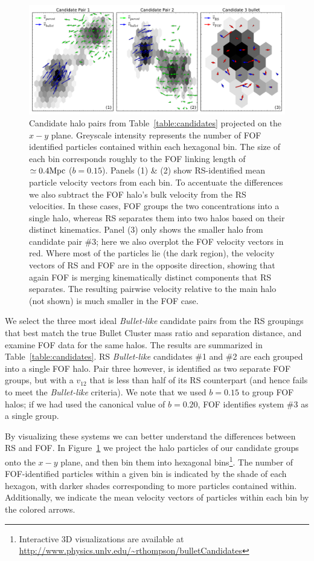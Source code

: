 \documentclass[useAMS, usenatbib]{mn2e}
\newcommand{\vonetwo}{v_{12}}
\begin{document}
\begin{figure}
\includegraphics[scale=0.5]{figure5.pdf}
\caption{Candidate halo pairs from Table~\ref{table:candidates} projected on the $x-y$ plane.  Greyscale
intensity represents the number of FOF identified particles contained
within each hexagonal bin.  The size of each bin corresponds roughly
to the FOF linking length of $\simeq0.4\rm{Mpc}$ ($b=0.15$).  Panels
(1) \& (2) show RS-identified mean particle velocity vectors from
each bin.  To accentuate the differences we also subtract the FOF
halo's bulk velocity from the RS velocities.  In these cases,
FOF groups the two concentrations into a single halo, whereas
RS separates them into two halos based on their distinct kinematics.
Panel (3) only shows
the smaller halo from candidate pair \#3; here we also overplot the FOF
velocity vectors in red.  Where most of the particles
lie (the dark region), the velocity vectors of RS and FOF are
in the opposite direction, showing that again FOF is merging kinematically
distinct components that RS separates.  The resulting pairwise velocity
relative to the main halo (not shown) is much smaller in the FOF case.
}
\label{fig:vis}
\end{figure}

We select the three most ideal {\it Bullet-like} candidate pairs from the
RS groupings that best match the true Bullet Cluster mass ratio and
separation distance, and examine FOF data for the same halos.  The
results are summarized in Table~\ref{table:candidates}.  RS {\it Bullet-like}
candidates \#1 and \#2 are each grouped into a single FOF halo.
Pair three however, is identified as two separate FOF groups, but
with a $\vonetwo$ that is less than half of its RS counterpart (and
hence fails to meet the {\it Bullet-like} criteria).  We note that we
used $b=0.15$ to group FOF halos; if we had used the canonical value
of $b=0.20$, FOF identifies system \#3 as a single group.

By visualizing these systems we can better understand the differences
between RS and FOF.  In Figure~\ref{fig:vis} we project the halo
particles of our candidate groups onto the $x-y$ plane, and then
bin them into hexagonal bins\footnote{Interactive 3D visualizations are available at \url{http://www.physics.unlv.edu/~rthompson/bulletCandidates}}.  The number of FOF-identified particles within a given
bin is indicated by the shade of each hexagon, with darker shades
corresponding to more particles contained within.  Additionally,
we indicate the mean velocity vectors of particles within each bin
by the colored arrows.
\end{document}
